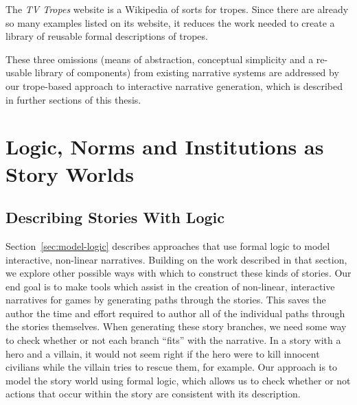 \documentclass[11pt]{report}
\begin{document}
The \emph{TV Tropes} website is a Wikipedia of sorts for tropes. Since there are
already so many examples listed on its website, it reduces the work needed to
create a library of reusable formal descriptions of tropes.

These three omissions (means of abstraction, conceptual simplicity and a
re-usable library of components) from existing narrative systems are addressed
by our trope-based approach to interactive narrative generation, which is
described in further sections of this thesis.



\chapter{Logic, Norms and Institutions as Story Worlds}
\label{cha:institutions}


\section{Describing Stories With Logic}
Section~\ref{sec:model-logic} describes approaches that use formal logic to model interactive, non-linear narratives. Building on the work described in that section, we explore other possible ways with which to construct these kinds of stories.
Our end goal is to make tools which assist in the creation of non-linear,
interactive narratives for games by generating paths through the stories. This
saves the author the time and effort required to author all of the individual
paths through the stories themselves. When generating these story branches, we
need some way to check whether or not each branch ``fits'' with the narrative.
In a story with a hero and a villain, it would not seem right if the hero were
to kill innocent civilians while the villain tries to rescue them, for example.
Our approach is to model the story world using formal logic, which allows us to
check whether or not actions that occur within the story are consistent with its description.
\end{document}
